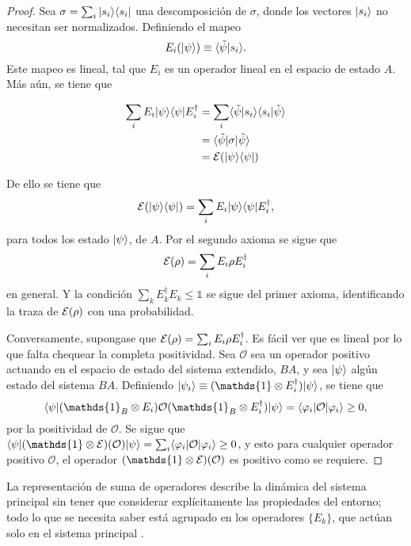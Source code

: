 \begin{proof}
Sea $\sigma=\sum_i|s_i\rangle \langle s_i|$ una descomposición de $\sigma$, donde los vectores $|s_i\rangle$ no necesitan ser normalizados. Definiendo el mapeo \[E_i(|\psi\rangle) \equiv \langle\tilde{\psi}|s_i\rangle.\] Este mapeo es lineal, tal que $E_i$ es un operador lineal en el espacio de estado $A$. Más aún, se tiene que  

\begin{equation}
    \begin{split}
       \sum_i E_i |\psi \rangle \langle \psi |E_i^\dagger&=\sum_i  \langle\tilde{\psi}|s_i\rangle \langle s_i|\tilde{\psi}\rangle\\
        &=\langle \tilde \psi |\sigma |\tilde{\psi}\rangle\\
        &=\mathcal{E}(|\psi \rangle \langle\psi|)\\
    \end{split}
\end{equation}



De ello se tiene que  \[\mathcal{E}(|\psi\rangle \langle \psi|)=\sum_i E_i |\psi \rangle \langle \psi |E_i^\dagger,\] para todos los estado $|\psi\rangle$, de $A$. Por el segundo axioma se sigue que \[\mathcal{E}(\rho)=\sum_i E_i \rho E_i^\dagger\] en general. Y la condición $\sum_k E_k^\dagger E_k\le \mathds{1}$ se sigue del primer axioma, identificando la traza de $\mathcal{E}(\rho) $ con una probabilidad.


Conversamente, supongase que $\mathcal{E}(\rho)=\sum_i E_i \rho E_i^\dagger$. Es fácil ver que es lineal por lo que falta chequear la completa positividad. Sea $\mathcal{O}$ sea un operador positivo actuando en el espacio de estado del sistema extendido, $BA$, y sea $|\psi \rangle$ algún estado del sistema $BA$. Definiendo $|\psi_i\ra \equiv (\mathds{1}\otimes E_i^\dagger)|\psi\ra$, se tiene que \[\la \psi |(\mathds{1}_B\otimes E_i)\mathcal{O}(\mathds{1}_B\otimes E_i^\dagger)|\psi\ra=\la \varphi_i |\mathcal{O}|\varphi_i\ra \ge 0,\] por la positividad de $\mathcal{O}$. Se sigue que $\la \psi| (\mathds{1}\otimes\E)(\mathcal{O})|\psi\ra=\sum_i \la \varphi_i|\mathcal{O}|\varphi_i\ra \ge 0$, y esto para cualquier operador positivo $\mathcal{O}$, el operador $(\mathds{1}\otimes \E)(\mathcal{O})$ es positivo como se requiere.
\end{proof}

La representación de suma de operadores describe la dinámica del sistema principal sin tener que considerar explícitamente las propiedades del entorno; todo lo que se necesita saber está agrupado en los operadores $\{E_k\}$, que actúan solo en el sistema principal {\cite{nielsen_chuang_2010}}.

